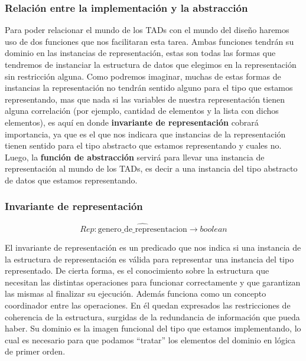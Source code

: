 \documentclass[10pt, a4paper]{report}
\begin{document}
\subsubsection{Relaci\'on entre la implementaci\'on y la abstracci\'on}

Para poder relacionar el mundo de los TADs con el mundo del dise\~no haremos uso de dos funciones que nos facilitaran esta tarea. Ambas funciones tendr\'an su dominio en las instancias de representaci\'on, estas son todas las formas que tendremos de instanciar la estructura de datos que elegimos en la representaci\'on sin restricci\'on alguna. Como podremos imaginar, muchas de estas formas de instancias la representaci\'on no tendr\'an sentido alguno para el tipo que estamos representando, mas que nada si las variables de nuestra representaci\'on tienen alguna correlaci\'on (por ejemplo, cantidad de elementos y la lista con dichos elementos), es aqu\'i en donde \textbf{invariante de representaci\'on} cobrar\'a importancia, ya que es el que nos indicara que instancias de la representaci\'on tienen sentido para el tipo abstracto que estamos representando y cuales no. Luego, la \textbf{funci\'on de abstracci\'on} servir\'a para llevar una instancia de representaci\'on al mundo de los TADs, es decir a una 
instancia del tipo abstracto de datos que estamos representando.

\subsubsection{Invariante de representaci\'on}

\begin{equation*}
Rep: \widehat{\text{genero\_de\_representacion}} \rightarrow boolean
\end{equation*}

El invariante de representaci\'on es un predicado que nos indica si una instancia de la estructura de representaci\'on es v\'alida para representar una instancia del tipo representado. De cierta forma, es el conocimiento sobre la estructura que necesitan las distintas operaciones para funcionar correctamente y que garantizan las mismas al finalizar su ejecuci\'on. Adem\'as funciona como un concepto coordinador entre las operaciones. En \'el quedan expresados las restricciones de coherencia de la estructura, surgidas de la redundancia de informaci\'on que pueda haber. Su dominio es la imagen funcional del tipo que estamos implementando, lo cual es necesario para que podamos ``tratar'' los elementos del dominio en l\'ogica de primer orden.
\end{document}
